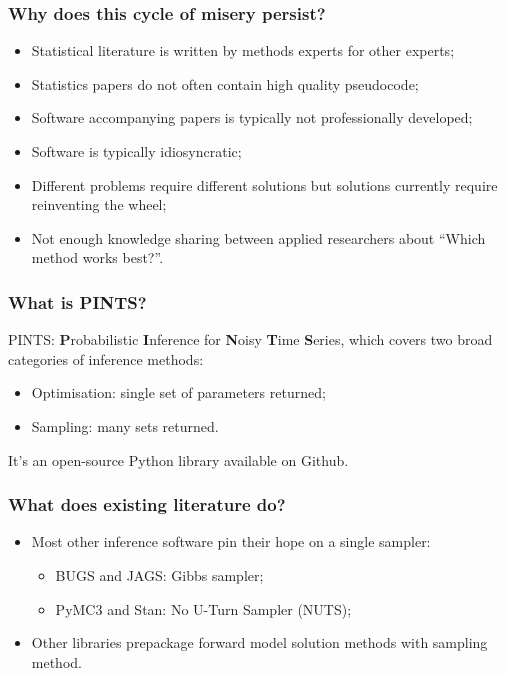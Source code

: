 \documentclass[handout]{beamer}
\begin{document}
\begin{frame}
	\frametitle{Why does this cycle of misery persist?}
	
	\begin{itemize}
		\item Statistical literature is written by methods experts for other experts;
		\item Statistics papers do not often contain high quality pseudocode;
		\item Software accompanying papers is typically not professionally developed;
		\item Software is typically idiosyncratic;
		\item Different problems require different solutions but solutions currently require reinventing the wheel;
		\item Not enough knowledge sharing between applied researchers about ``Which method works best?''.
	\end{itemize}
	
\end{frame}

\begin{frame}
\frametitle{What is PINTS?}

PINTS: \textbf{P}robabilistic \textbf{I}nference for \textbf{N}oisy \textbf{T}ime \textbf{S}eries, which covers two broad categories of inference methods:

\begin{itemize}
	\item Optimisation: single set of parameters returned;
	\item Sampling: many sets returned.
\end{itemize}

It's an open-source Python library available on Github.

\end{frame}


\begin{frame}
\frametitle{What does existing literature do?}


\begin{itemize}
	\item Most other inference software pin their hope on a single sampler:
	\begin{itemize}
		\item BUGS and JAGS: Gibbs sampler;
		\item PyMC3 and Stan: No U-Turn Sampler (NUTS);
	\end{itemize}
	\item Other libraries prepackage forward model solution methods with sampling method.
\end{itemize}

\end{frame}
\end{document}
